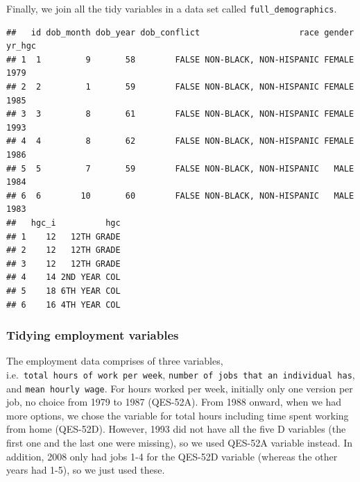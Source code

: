 \documentclass{article}
\newenvironment{Shaded}{\begin{snugshade}}{\end{snugshade}}
\newcommand{\DataTypeTok}[1]{\textcolor[rgb]{0.13,0.29,0.53}{#1}}
\newcommand{\KeywordTok}[1]{\textcolor[rgb]{0.13,0.29,0.53}{\textbf{#1}}}
\newcommand{\NormalTok}[1]{#1}
\newcommand{\OperatorTok}[1]{\textcolor[rgb]{0.81,0.36,0.00}{\textbf{#1}}}
\newcommand{\StringTok}[1]{\textcolor[rgb]{0.31,0.60,0.02}{#1}}
\begin{document}
Finally, we join all the tidy variables in a data set called
\texttt{full\_demographics}.

\begin{Shaded}
\end{Shaded}

\begin{verbatim}
##   id dob_month dob_year dob_conflict                    race gender yr_hgc
## 1  1         9       58        FALSE NON-BLACK, NON-HISPANIC FEMALE   1979
## 2  2         1       59        FALSE NON-BLACK, NON-HISPANIC FEMALE   1985
## 3  3         8       61        FALSE NON-BLACK, NON-HISPANIC FEMALE   1993
## 4  4         8       62        FALSE NON-BLACK, NON-HISPANIC FEMALE   1986
## 5  5         7       59        FALSE NON-BLACK, NON-HISPANIC   MALE   1984
## 6  6        10       60        FALSE NON-BLACK, NON-HISPANIC   MALE   1983
##   hgc_i          hgc
## 1    12   12TH GRADE
## 2    12   12TH GRADE
## 3    12   12TH GRADE
## 4    14 2ND YEAR COL
## 5    18 6TH YEAR COL
## 6    16 4TH YEAR COL
\end{verbatim}

\hypertarget{tidying-employment-variables}{%
\subsubsection{Tidying employment
variables}\label{tidying-employment-variables}}

The employment data comprises of three variables,
i.e.~\texttt{total\ hours\ of\ work\ per\ week},
\texttt{number\ of\ jobs\ that\ an\ individual\ has}, and
\texttt{mean\ hourly\ wage}. For hours worked per week, initially only
one version per job, no choice from 1979 to 1987 (QES-52A). From 1988
onward, when we had more options, we chose the variable for total hours
including time spent working from home (QES-52D). However, 1993 did not
have all the five D variables (the first one and the last one were
missing), so we used QES-52A variable instead. In addition, 2008 only
had jobs 1-4 for the QES-52D variable (whereas the other years had 1-5),
so we just used these.
\end{document}
